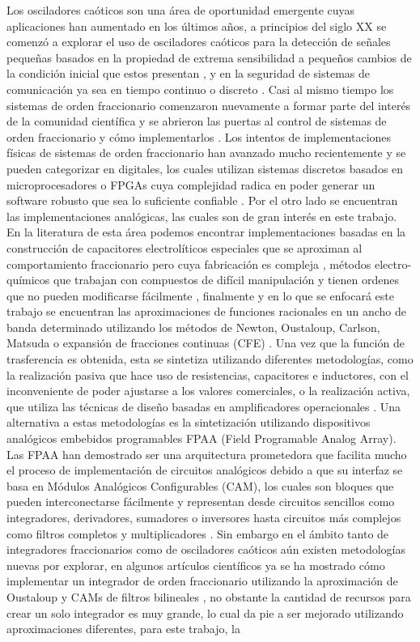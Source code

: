 	Los osciladores caóticos son una área de oportunidad emergente cuyas aplicaciones han aumentado en los últimos años, a principios del siglo XX se comenzó a explorar el uso de osciladores caóticos para la detección de señales pequeñas basados en la propiedad  de extrema sensibilidad a pequeños cambios de la condición inicial que estos presentan \cite{Wang1999}, y en la seguridad de sistemas de comunicación ya sea en tiempo continuo o discreto \cite{Tepina2002}.  Casi al mismo tiempo los sistemas de orden fraccionario comenzaron nuevamente a formar parte del interés de la comunidad científica  y se abrieron las puertas al control de sistemas de orden fraccionario y cómo implementarlos \cite{Chen2009,Das2007}. Los intentos de implementaciones físicas de sistemas de orden fraccionario han avanzado mucho recientemente y se pueden categorizar en digitales, los cuales utilizan sistemas discretos basados en microprocesadores o FPGAs cuya complejidad radica en poder generar un software robusto que sea lo suficiente confiable \cite{Gunay2017}. Por el otro lado se encuentran las implementaciones analógicas, las cuales son de gran interés en este trabajo. En la literatura de esta área podemos encontrar implementaciones basadas en la construcción de capacitores electrolíticos especiales que se aproximan al comportamiento fraccionario pero cuya fabricación es compleja \cite{Jesus2008}, métodos electro-químicos que trabajan con compuestos de difícil manipulación y tienen ordenes que no pueden modificarse fácilmente \cite{Biswas2006}, finalmente y en lo que se enfocará este trabajo se encuentran las aproximaciones de funciones racionales en un ancho de banda determinado utilizando los métodos de Newton, Oustaloup, Carlson, Matsuda o expansión de fracciones continuas (CFE) \cite{Charef2006,Krishna2011,Krishna2008}. Una vez que la función de trasferencia es obtenida, esta se sintetiza utilizando diferentes metodologías, como la realización pasiva que hace uso de resistencias, capacitores e inductores, con el inconveniente de poder ajustarse a los valores comerciales, o la realización activa, que utiliza las técnicas de diseño basadas en amplificadores operacionales \cite{Tepljakov2013, Dorcak2012}. Una alternativa a estas metodologías es la sintetización utilizando dispositivos analógicos embebidos programables FPAA (Field Programable Analog Array). Las FPAA han demostrado ser una arquitectura prometedora que facilita mucho el proceso de implementación de circuitos analógicos debido a que su interfaz se basa en Módulos Analógicos Configurables (CAM), los cuales son bloques que pueden interconectarse fácilmente y representan desde circuitos sencillos como integradores, derivadores, sumadores o inversores hasta circuitos más complejos como filtros completos y multiplicadores \cite{Fragoulis2009}. Sin embargo en el ámbito tanto de integradores fraccionarios como de osciladores caóticos aún existen metodologías nuevas por explorar, en algunos artículos científicos ya se ha mostrado cómo implementar un integrador de orden fraccionario utilizando la aproximación de Oustaloup y CAMs de filtros bilineales \cite{Caponetto2006}, no obstante la cantidad de recursos para crear un solo integrador es muy grande, lo cual da pie a ser mejorado utilizando aproximaciones diferentes, para este trabajo, la 
